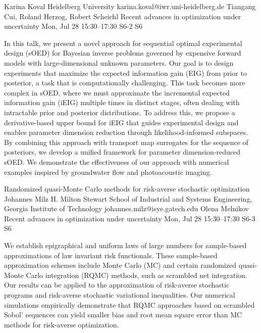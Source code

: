 \begin{talk}
  {Karina Koval}%
  {Heidelberg University}%
  {karina.koval@iwr.uni-heidelberg.de}%
  {Tiangang Cui, Roland Herzog, Robert Scheichl}%
  {Recent advances in optimization under uncertainty}%
  {}%
  {Mon, Jul 28 15:30–17:30}%
  {S6-2}%
  {S6}%
				
			
In this talk, we present a novel approach for sequential optimal experimental design (sOED) for Bayesian inverse problems governed by expensive forward models with large-dimensional unknown parameters. Our goal is to design experiments that maximize the expected information gain (EIG) from prior to posterior, a task that is computationally challenging. This task becomes more complex in sOED, where we must approximate the incremental expected information gain (iEIG) multiple times in distinct stages, often dealing with intractable prior and posterior distributions. To address this, we propose a derivative-based upper bound for iEIG that guides experimental design and enables parameter dimension reduction through likelihood-informed subspaces. By combining this approach with transport map surrogates for the sequence of posteriors, we develop a unified framework for parameter dimension-reduced sOED. We demonstrate the effectiveness of our approach with numerical examples inspired by groundwater flow and photoacoustic imaging.
\end{talk}

\begin{talk}
  {Randomized quasi-Monte Carlo methods for risk-averse stochastic optimization}%
  {Johannes Milz}%
  {H. Milton Stewart School of Industrial and Systems Engineering, Georgia Institute of Technology}%
  {johannes.milz@isye.gatech.edu}%
  {Olena Melnikov}%
  {Recent advances in optimization under uncertainty}%
  {Mon, Jul 28 15:30–17:30}%
  {S6-3}%
  {S6}%
				

We establish epigraphical and uniform laws of large numbers for sample-based approximations of law invariant risk functionals. These sample-based approximation schemes include Monte Carlo (MC) and certain randomized quasi-Monte Carlo integration (RQMC) methods, such as scrambled net integration. Our results can be applied to the approximation of risk-averse stochastic programs and risk-averse stochastic variational inequalities. Our numerical simulations empirically demonstrate that RQMC approaches based on scrambled Sobol' sequences can yield smaller bias and root mean square error than MC methods for risk-averse optimization.




\end{talk}

